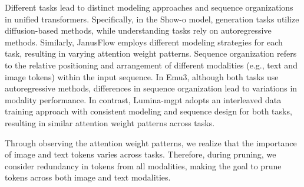 Different tasks lead to distinct modeling approaches and sequence organizations in unified transformers. Specifically, in the Show-o model, generation tasks utilize diffusion-based methods, while understanding tasks rely on autoregressive methods. Similarly, JanusFlow employs different modeling strategies for each task, resulting in varying attention weight patterns. Sequence organization refers to the relative positioning and arrangement of different modalities (e.g., text and image tokens) within the input sequence. In Emu3, although both tasks use autoregressive methods, differences in sequence organization lead to variations in modality performance. In contrast, Lumina-mgpt adopts an interleaved data training approach with consistent modeling and sequence design for both tasks, resulting in similar attention weight patterns across tasks.




Through observing the attention weight patterns, we realize that the importance of image and text tokens varies across tasks. Therefore, during pruning, we consider redundancy in tokens from all modalities, making the goal to prune tokens across both image and text modalities.








